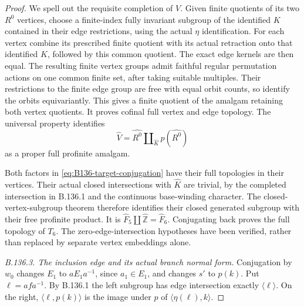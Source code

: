 \begin{proof}
We spell out the requisite completion of $V$. Given finite
quotients of its two $R^0$ vertices, choose a finite-index fully
invariant subgroup of the identified $K$ contained in their
edge restrictions, using the actual $\eta$ identification.
For each vertex combine its prescribed finite quotient with
its actual retraction onto that identified $K$, followed by
this common quotient. The exact edge kernels are then equal.
The resulting finite vertex groups admit faithful regular
permutation actions on one common finite set, after taking
suitable multiples. Their restrictions to the finite edge group
are free with equal orbit counts, so identify the orbits
equivariantly. This gives a finite quotient of the amalgam
retaining both vertex quotients. It proves cofinal full vertex
and edge topology. The universal property identifies
\[
 \widehat V=\widehat{R^0}
       \amalg_{\widehat K}p(\widehat{R^0})
\]
as a proper full profinite amalgam.

Both factors in \eqref{eq:B136-target-conjugation} have their
full topologies in their vertices. Their actual closed
intersections with $\widehat K$ are trivial, by the completed
intersection in B.136.1 and the continuous base-winding character.
The closed-vertex-subgroup theorem
\cite[Corollary~2.18, with Lemma~2.17]{BLopesZalesskii2025}
therefore identifies their closed generated subgroup with their
free profinite product. It is $\widehat F_5\amalg
\widehat{\mathbb Z}=\widehat F_6$. Conjugating back proves the
full topology of $T_6$. The zero-edge-intersection hypotheses
have been verified, rather than replaced by separate vertex
embeddings alone.

\emph{B.136.3. The inclusion edge and its actual branch normal form.}
Conjugation by $w_0$ changes $E_1$ to $aE_1a^{-1}$, since
$a_1\in E_1$, and changes $s'$ to $p(k)$. Put
$\ell=afa^{-1}$. By B.136.1 the left subgroup has edge
intersection exactly $\langle\ell\rangle$. On the right,
$\langle\ell,p(k)\rangle$ is the image under $p$ of
$\langle\eta(\ell),k\rangle$.


\end{proof}
